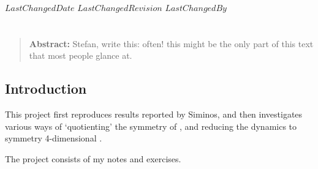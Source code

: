 
{$LastChangedDate$}
{$LastChangedRevision$} {$LastChangedBy$}


\chapter{\CLf}
\label{chap:CLF}

\begin{quote}
{\bf Abstract:}
    {\color{red}
Stefan, write this: often! this might be the only part
of this text that most people glance at.
    }
\end{quote}

\section{Introduction}
\label{sect:intro}
This project first reproduces results reported by
Siminos, and then investigates various ways
of `quotienting' the  symmetry of \cLe, and reducing
the dynamics to symmetry 4-dimensional \reducedsp.


The project consists of my notes and exercises.

